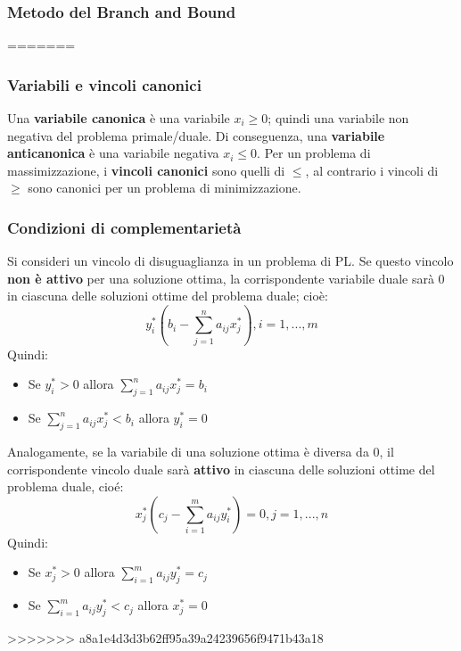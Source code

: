 \documentclass[12pt]{article}
\begin{document}
\subsubsection{Metodo del Branch and Bound}




=======
\subsubsection{Variabili e vincoli canonici}
Una \textbf{variabile canonica} è una variabile $x_i \geq 0$; quindi una variabile non negativa del problema primale/duale.
Di conseguenza, una \textbf{variabile anticanonica} è una variabile negativa $x_i \leq 0$.
Per un problema di massimizzazione, i \textbf{vincoli canonici} sono quelli di $\leq$, al contrario i vincoli di $\geq$ sono canonici
per un problema di minimizzazione.
\subsubsection{Condizioni di complementarietà}
Si consideri un vincolo di disuguaglianza in un problema di PL. Se questo vincolo \textbf{non è attivo} per una soluzione ottima, la corrispondente
variabile duale sarà 0 in ciascuna delle soluzioni ottime del problema duale; cioè:
$$y_i^*(b_i - \sum_{j=1}^{n}a_{ij}x_j^*), i=1,...,m$$
Quindi:
\begin{itemize}
    \item Se $y_i^* > 0$ allora $\sum_{j=1}^{n} a_{ij}x_j^* = b_i$
    \item Se $\sum_{j=1}^{n} a_{ij}x_j^* < b_i$ allora $y_i^*=0$
\end{itemize}
Analogamente, se la variabile di una soluzione ottima è diversa da 0, il corrispondente vincolo duale sarà \textbf{attivo} in ciascuna delle soluzioni ottime del problema duale, cioé:
$$x_j^*(c_j - \sum_{i=1}^{m}a_{ij}y_i^*)=0, j=1,...,n$$
Quindi:
\begin{itemize}
    \item Se $x_j^* > 0$ allora $\sum_{i=1}^{m} a_{ij}y_j^* = c_j$
    \item Se $\sum_{i=1}^{m} a_{ij}y_j^* < c_j$ allora $x_j^* = 0$
\end{itemize}
>>>>>>> a8a1e4d3d3b62ff95a39a24239656f9471b43a18
\end{document}
